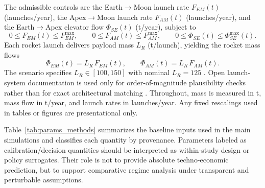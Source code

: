 \documentclass[12pt]{article}
\begin{document}
The admissible controls are the Earth$\to$Moon launch rate $F_{EM}(t)$ (launches/year), the Apex$\to$Moon launch rate $F_{AM}(t)$ (launches/year), and the Earth$\to$Apex elevator flow $\Phi_{SE}(t)$ (t/year), subject to
\begin{equation}
	0 \leq F_{EM}(t) \leq F_{EM}^{\max}, \qquad
	0 \leq F_{AM}(t) \leq F_{AM}^{\max}, \qquad
	0 \leq \Phi_{SE}(t) \leq \Phi_{SE}^{\max}(t).
	\label{eq:controls_bounds_m3}
\end{equation}
Each rocket launch delivers payload mass $L_R$ (t/launch), yielding the rocket mass flows
\begin{equation}
	\Phi_{EM}(t)=L_R\,F_{EM}(t), \qquad
	\Phi_{AM}(t)=L_R\,F_{AM}(t).
	\label{eq:rocket_flows_methods}
\end{equation}
The scenario specifies $L_R\in[100,150]$ with nominal $L_R=125$ \cite{COMAP2026B}. Open launch-system documentation is used only for order-of-magnitude plausibility checks rather than for exact architectural matching \cite{SpaceX2025FalconUsersGuide,NASA2023SLSFactsheet}. Throughout, mass is measured in t, mass flow in t/year, and launch rates in launches/year. Any fixed rescalings used in tables or figures are presentational only.

Table~\ref{tab:params_methods} summarizes the baseline inputs used in the main simulations and classifies each quantity by provenance. Parameters labeled as calibration/decision quantities should be interpreted as within-study design or policy surrogates. Their role is not to provide absolute techno-economic prediction, but to support comparative regime analysis under transparent and perturbable assumptions.
\end{document}

